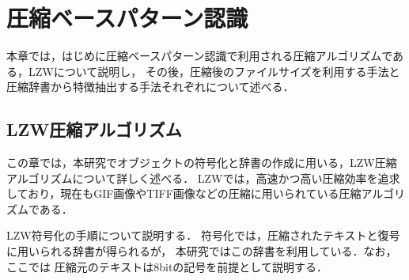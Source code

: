 \chapter{圧縮ベースパターン認識}
本章では，はじめに圧縮ベースパターン認識で利用される圧縮アルゴリズムである，LZWについて説明し，
その後，圧縮後のファイルサイズを利用する手法と圧縮辞書から特徴抽出する手法それぞれについて述べる．


\section{LZW圧縮アルゴリズム}
この章では，本研究でオブジェクトの符号化と辞書の作成に用いる，LZW圧縮アルゴリズムについて詳しく述べる．
LZWでは，高速かつ高い圧縮効率を追求しており，現在もGIF画像やTIFF画像などの圧縮に用いられている圧縮アルゴリズムである．

LZW符号化の手順について説明する．
符号化では，圧縮されたテキストと復号に用いられる辞書が得られるが，
本研究ではこの辞書を利用している．なお，ここでは
圧縮元のテキストは8bitの記号を前提として説明する．

\begin{table}[tb]%
\caption{初期状態のLZW辞書．}
\label{lz}
\begin{center}
\end{center}
\end{table}

